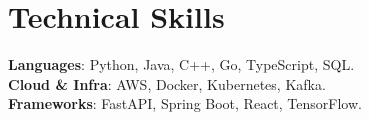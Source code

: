 \documentclass[10pt]{article}
\begin{document}
\section{Technical Skills}
\begin{itemize}[leftmargin=0in, label={}]
    \small{\item{

     \textbf{Languages}{: Python, Java, C++, Go, TypeScript, SQL.} \\

     \textbf{Cloud \& Infra}{: AWS, Docker, Kubernetes, Kafka.} \\

     \textbf{Frameworks}{: FastAPI, Spring Boot, React, TensorFlow.}

    }}
\end{itemize}
\end{document}
